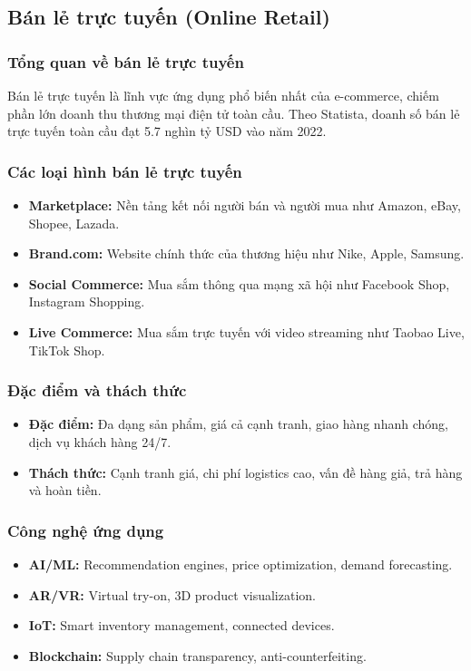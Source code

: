\documentclass[a4paper,12pt]{report}
\begin{document}
\subsection{Bán lẻ trực tuyến (Online Retail)}

\subsubsection{Tổng quan về bán lẻ trực tuyến}
Bán lẻ trực tuyến là lĩnh vực ứng dụng phổ biến nhất của e-commerce, chiếm phần lớn doanh thu thương mại điện tử toàn cầu. Theo Statista, doanh số bán lẻ trực tuyến toàn cầu đạt 5.7 nghìn tỷ USD vào năm 2022.

\subsubsection{Các loại hình bán lẻ trực tuyến}
\begin{itemize}
    \item \textbf{Marketplace:} Nền tảng kết nối người bán và người mua như Amazon, eBay, Shopee, Lazada.
    \item \textbf{Brand.com:} Website chính thức của thương hiệu như Nike, Apple, Samsung.
    \item \textbf{Social Commerce:} Mua sắm thông qua mạng xã hội như Facebook Shop, Instagram Shopping.
    \item \textbf{Live Commerce:} Mua sắm trực tuyến với video streaming như Taobao Live, TikTok Shop.
\end{itemize}

\subsubsection{Đặc điểm và thách thức}
\begin{itemize}
    \item \textbf{Đặc điểm:} Đa dạng sản phẩm, giá cả cạnh tranh, giao hàng nhanh chóng, dịch vụ khách hàng 24/7.
    \item \textbf{Thách thức:} Cạnh tranh giá, chi phí logistics cao, vấn đề hàng giả, trả hàng và hoàn tiền.
\end{itemize}

\subsubsection{Công nghệ ứng dụng}
\begin{itemize}
    \item \textbf{AI/ML:} Recommendation engines, price optimization, demand forecasting.
    \item \textbf{AR/VR:} Virtual try-on, 3D product visualization.
    \item \textbf{IoT:} Smart inventory management, connected devices.
    \item \textbf{Blockchain:} Supply chain transparency, anti-counterfeiting.
\end{itemize}
\end{document}
